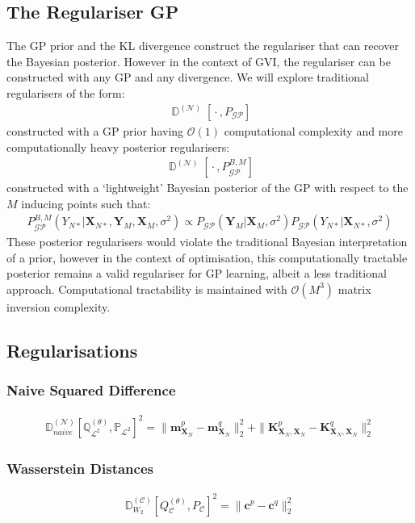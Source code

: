 \documentclass{article}
\newcommand{\D}{\operatorname{\mathbb{D}}}
\newcommand{\GP}{\operatorname{\mathcal{GP}}}
\newcommand{\wc}{\operatorname{{}\cdot{}}}
\numberwithin{equation}{section}
\begin{document}
\subsection{The Regulariser GP}
The GP prior and the KL divergence construct the regulariser that can recover the Bayesian posterior. However in the context of GVI, the regulariser can be constructed with any GP and any divergence. We will explore traditional regularisers of the form:
\begin{align}
    \D^{(\mathcal{N})}\left[\wc, P_{\GP}\right]
    \label{prior-regulariser}
\end{align}
constructed with a GP prior having $\mathcal{O}(1)$ computational complexity and more computationally heavy posterior regularisers:
\begin{align}
    \D^{(\mathcal{N})}\left[\wc, P^{B, M}_{\GP}\right]
    \label{posterior-regulariser}
\end{align}
constructed with a `lightweight' Bayesian posterior of the GP with respect to the $M$ inducing points such that:
\begin{align}
    P^{B, M}_{\GP}\left(Y_{N*} \vert \mathbf{X}_{N*}, \mathbf{Y}_M, \mathbf{X}_M, \sigma^2\right) \propto P_{\GP}\left(\mathbf{Y}_M \vert \mathbf{X}_M, \sigma^2\right) P_{\GP}\left(Y_{N*} \vert \mathbf{X}_{N*}, \sigma^2\right)
\end{align}
These posterior regularisers would violate the traditional Bayesian interpretation of a prior, however in the context of optimisation, this computationally tractable posterior remains a valid regulariser for GP learning, albeit a less traditional approach. Computational tractability is maintained with $\mathcal{O}(M^3)$ matrix inversion complexity.

\subsection{Regularisations}
\subsubsection{Naive Squared Difference}
\begin{align}
    \mathbb{D}_{naive}^{(\mathcal{N})} \left[\mathbb{Q}^{(\theta)}_{\mathcal{L}^2}, \mathbb{P}_{\mathcal{L}^2}\right]^2 = \|\mathbf{m}_{\mathbf{X}_N}^p - \mathbf{m}_{\mathbf{X}_N}^q\|_2^2 + \|\mathbf{K}_{\mathbf{X}_N, \mathbf{X}_N}^p - \mathbf{K}_{\mathbf{X}_N, \mathbf{X}_N}^q\|_2^2
\end{align}
\subsubsection{Wasserstein Distances}
\begin{align}
    \mathbb{D}_{W_2}^{(\mathcal{C})} \left[Q^{(\theta)}_{\mathcal{C}}, P_{\mathcal{C}}\right]^2 = \|\mathbf{c}^p - \mathbf{c}^q\|_2^2
\end{align}
\end{document}
